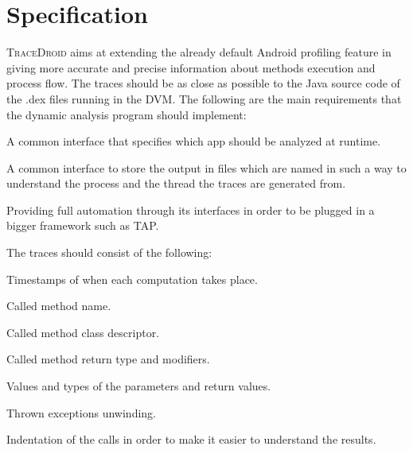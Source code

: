 \section{Specification}
\label{sec:scope_specification}

\textsc{TraceDroid} aims at extending the already default Android profiling
feature in giving more accurate and precise information about methods
execution and process flow. The traces should be as close as possible
to the Java source code of the .dex files running in the DVM. The
following are the main requirements that the dynamic analysis program
should implement:
\begin{itemize*}
    \item A common interface that specifies which app should be
      analyzed at runtime.
    \item A common interface to store the output in files which are
      named in such a way to understand the process and the thread the
      traces are generated from.
    \item Providing full automation through its interfaces in order to
      be plugged in a bigger framework such as TAP.
    \item The traces should consist of the following:
      \begin{itemize*}
           \item Timestamps of when each computation takes place.
           \item Called method name.
           \item Called method class descriptor.
           \item Called method return type and modifiers.
           \item Values and types of the parameters and return values.
           \item Thrown exceptions unwinding.
           \item Indentation of the calls in order to make it easier
             to understand the results.
      \end{itemize*}
\end{itemize*}      
